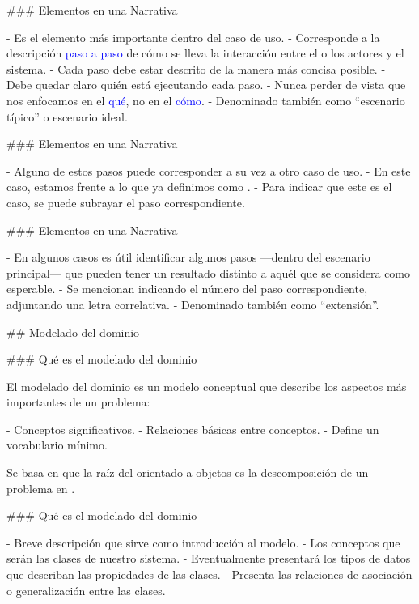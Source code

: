 ### Elementos en una Narrativa


- Es el elemento más importante dentro del caso de uso.
- Corresponde a la descripción \textcolor{blue}{paso a paso} de cómo se lleva la interacción
entre el o los actores y el sistema.
- Cada paso debe estar descrito de la manera más concisa posible.
- Debe quedar claro quién está ejecutando cada paso.
- Nunca perder de vista que nos enfocamos en el \textcolor{blue}{qué}, no en el \textcolor{blue}{cómo}.
- Denominado también como ``escenario típico'' o escenario ideal.

### Elementos en una Narrativa


- Alguno de estos pasos puede corresponder a su vez a otro caso de uso.
    - En este caso, estamos frente a lo que ya definimos como .
    - Para indicar que este es el caso, se puede subrayar el paso correspondiente.


### Elementos en una Narrativa


- En algunos casos es útil identificar algunos pasos ---dentro del escenario principal--- que
pueden tener un resultado distinto a aquél que se considera como esperable.
- Se mencionan indicando el número del paso correspondiente, adjuntando una letra correlativa.
- Denominado también como ``extensión''.



## Modelado del dominio

### Qué es el modelado del dominio


El modelado del dominio es un modelo conceptual que describe los aspectos más importantes de un
problema:

- Conceptos significativos.
- Relaciones básicas entre conceptos.
- Define un vocabulario mínimo.\newline

Se basa en que la raíz del  orientado a objetos es la descomposición de un problema
en .

### Qué es el modelado del dominio


-  Breve descripción que sirve como introducción al modelo.
-  Los conceptos que serán las clases de nuestro sistema.
-  Eventualmente presentará los tipos de datos que describan
las propiedades de las clases.
-  Presenta las relaciones de asociación o generalización entre las clases.


